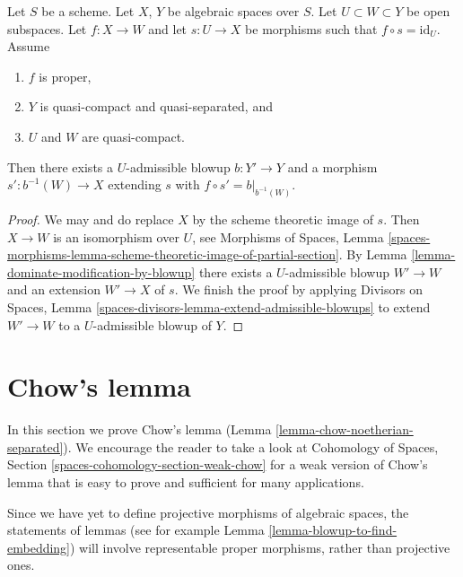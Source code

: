 \begin{lemma}
\label{lemma-get-section-after-blowup}
Let $S$ be a scheme. Let $X$, $Y$ be algebraic spaces over $S$.
Let $U \subset W \subset Y$ be open subspaces.
Let $f : X \to W$ and let $s : U \to X$ be morphisms
such that $f \circ s = \text{id}_U$. Assume
\begin{enumerate}
\item $f$ is proper,
\item $Y$ is quasi-compact and quasi-separated, and
\item $U$ and $W$ are quasi-compact.
\end{enumerate}
Then there exists a $U$-admissible blowup $b : Y' \to Y$ and a morphism
$s' : b^{-1}(W) \to X$ extending $s$ with $f \circ s' = b|_{b^{-1}(W)}$.
\end{lemma}

\begin{proof}
We may and do replace $X$ by the scheme theoretic image of $s$.
Then $X \to W$ is an isomorphism over $U$, see
Morphisms of Spaces, Lemma
\ref{spaces-morphisms-lemma-scheme-theoretic-image-of-partial-section}.
By Lemma \ref{lemma-dominate-modification-by-blowup}
there exists a $U$-admissible blowup $W' \to W$ and an
extension $W' \to X$ of $s$.
We finish the proof by applying
Divisors on Spaces, Lemma \ref{spaces-divisors-lemma-extend-admissible-blowups}
to extend $W' \to W$ to a $U$-admissible blowup of $Y$.
\end{proof}















\section{Chow's lemma}
\label{section-chow}

\noindent
In this section we prove Chow's lemma
(Lemma \ref{lemma-chow-noetherian-separated}).
We encourage the reader to take a look at
Cohomology of Spaces, Section \ref{spaces-cohomology-section-weak-chow}
for a weak version of Chow's lemma that is easy to prove and sufficient
for many applications.

\medskip\noindent
Since we have yet to define projective morphisms of algebraic spaces,
the statements of lemmas (see for example
Lemma \ref{lemma-blowup-to-find-embedding}) will
involve representable proper morphisms, rather than projective ones.

